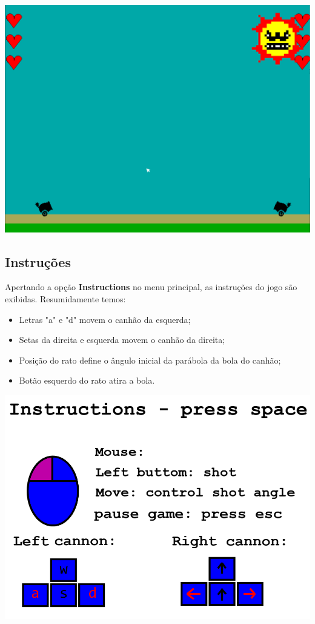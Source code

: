 \documentclass[12pt]{article}
\begin{document}
\begin{center}
    \includegraphics[width = 14cm]{Game.png}
\end{center}
\newpage 
\subsection{Instruções}
Apertando a opção \textbf{Instructions} no menu principal, as instruções do jogo são exibidas.
Resumidamente temos: 
\begin{itemize}
    \item Letras "a" e "d" movem o canhão da esquerda;
    \item Setas da direita e esquerda movem o canhão da direita; 
    \item Posição do rato define o ângulo inicial da parábola da bola do canhão;
    \item Botão esquerdo do rato atira a bola.
\end{itemize} 
\begin{center}
    \includegraphics[width = 14cm]{Instructions.png}
\end{center}
\newpage
\end{document}
